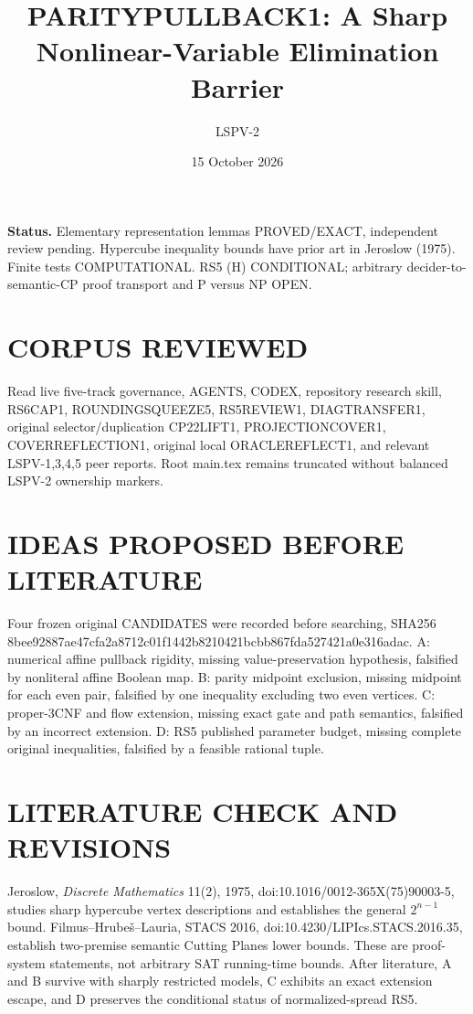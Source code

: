 \documentclass{article}
\title{PARITYPULLBACK1: A Sharp Nonlinear-Variable Elimination Barrier}
\author{LSPV-2}
\date{15 October 2026}
\begin{document}
\maketitle
\noindent\textbf{Status.} Elementary representation lemmas PROVED/EXACT, independent review pending. Hypercube inequality bounds have prior art in Jeroslow (1975). Finite tests COMPUTATIONAL. RS5 (H) CONDITIONAL; arbitrary decider-to-semantic-CP proof transport and P versus NP OPEN.
\section{CORPUS REVIEWED}
Read live five-track governance, AGENTS, CODEX, repository research skill, RS6CAP1, ROUNDINGSQUEEZE5, RS5REVIEW1, DIAGTRANSFER1, original selector/duplication CP22LIFT1, PROJECTIONCOVER1, COVERREFLECTION1, original local ORACLEREFLECT1, and relevant LSPV-1,3,4,5 peer reports. Root main.tex remains truncated without balanced LSPV-2 ownership markers.
\section{IDEAS PROPOSED BEFORE LITERATURE}
Four frozen original CANDIDATES were recorded before searching, SHA256 8bee92887ae47cfa2a8712c01f1442b8210421bcbb867fda527421a0e316adac. A: numerical affine pullback rigidity, missing value-preservation hypothesis, falsified by nonliteral affine Boolean map. B: parity midpoint exclusion, missing midpoint for each even pair, falsified by one inequality excluding two even vertices. C: proper-3CNF and flow extension, missing exact gate and path semantics, falsified by an incorrect extension. D: RS5 published parameter budget, missing complete original inequalities, falsified by a feasible rational tuple.
\section{LITERATURE CHECK AND REVISIONS}
Jeroslow, \emph{Discrete Mathematics} 11(2), 1975, doi:10.1016/0012-365X(75)90003-5, studies sharp hypercube vertex descriptions and establishes the general $2^{n-1}$ bound. Filmus--Hrube\v{s}--Lauria, STACS 2016, doi:10.4230/LIPIcs.STACS.2016.35, establish two-premise semantic Cutting Planes lower bounds. These are proof-system statements, not arbitrary SAT running-time bounds. After literature, A and B survive with sharply restricted models, C exhibits an exact extension escape, and D preserves the conditional status of normalized-spread RS5.
\end{document}
